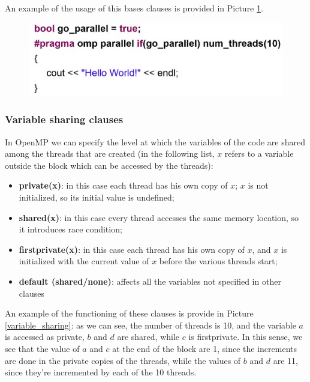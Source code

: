 An example of the usage of this bases clauses is provided in Picture \ref{basis_clauses}.

\begin{figure}[h!]
		\centering
		\includegraphics[scale = 1.4]{img/basis clauses.jpg}
        \label{basis_clauses}
\end{figure}

\subsubsection{Variable sharing clauses}
In OpenMP we can specify the level at which the variables of the code are shared among the threads that are created (in the following list, $x$ refers to a variable outside the block which can be accessed by the threads):

\begin{itemize}
    \item \textbf{private(x)}: in this case each thread has his own copy of $x$; $x$ is not initialized, so its initial value is undefined;
    \item \textbf{shared(x)}: in this case every thread accesses the same memory location, so it introduces race condition;
    \item \textbf{firstprivate(x)}: in this case each thread has his own copy of $x$, and $x$ is initialized with the current value of $x$ before the various threads start;
    \item \textbf{default (shared/none)}: affects all the variables not specified in other clauses
\end{itemize}

An example of the functioning of these clauses is provide in Picture \ref{variable_sharing}: as we can see, the number of threads is 10, and the variable $a$ is accessed as private, $b$ and $d$ are shared, while $c$ is firstprivate. In this sense, we see that the value of $a$ and $c$ at the end of the block are 1, since the increments are done in the private copies of the threads, while the values of $b$ and $d$ are 11, since they're incremented by each of the 10 threads.

